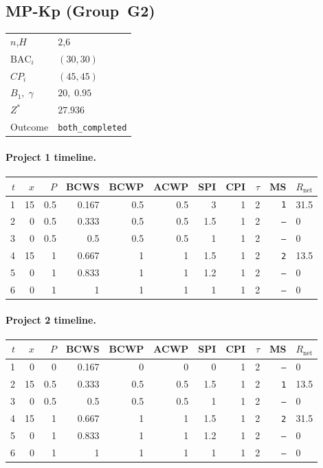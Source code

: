 \documentclass[12pt, a4paper]{article}
\newcommand{\BAC}{\mathrm{BAC}}
\begin{document}
\newpage

\subsection*{MP-Kp  (Group~G2)}
\begin{center}
\begin{tabular}{ll}
\toprule
$n$,\;$H$ & $2$,\;$6$ \\
$\BAC_i$ & $(30, 30)$ \\
$CP_i$   & $(45, 45)$ \\
$B_1,\;\gamma$ & $20,\;0.95$ \\
$Z^*$ & $27.936$ \\
Outcome & \texttt{both_completed} \\
\bottomrule
\end{tabular}
\end{center}

\paragraph{Project 1 timeline.}
\begin{center}
\begin{tabular}{rrrrrrrrrrl}
\toprule
$t$ & $x$ & $P$ & BCWS & BCWP & ACWP & SPI & CPI & $\tau$ & MS & $R_{\mathrm{net}}$\\
\midrule
1 & 15 & 0.5 & 0.167 & 0.5 & 0.5 & 3 & 1 & 2 & \texttt{1} & 31.5 \\
2 & 0 & 0.5 & 0.333 & 0.5 & 0.5 & 1.5 & 1 & 2 & \texttt{---} & 0 \\
3 & 0 & 0.5 & 0.5 & 0.5 & 0.5 & 1 & 1 & 2 & \texttt{---} & 0 \\
4 & 15 & 1 & 0.667 & 1 & 1 & 1.5 & 1 & 2 & \texttt{2} & 13.5 \\
5 & 0 & 1 & 0.833 & 1 & 1 & 1.2 & 1 & 2 & \texttt{---} & 0 \\
6 & 0 & 1 & 1 & 1 & 1 & 1 & 1 & 2 & \texttt{---} & 0 \\
\bottomrule
\end{tabular}
\end{center}
\paragraph{Project 2 timeline.}
\begin{center}
\begin{tabular}{rrrrrrrrrrl}
\toprule
$t$ & $x$ & $P$ & BCWS & BCWP & ACWP & SPI & CPI & $\tau$ & MS & $R_{\mathrm{net}}$\\
\midrule
1 & 0 & 0 & 0.167 & 0 & 0 & 0 & 1 & 2 & \texttt{---} & 0 \\
2 & 15 & 0.5 & 0.333 & 0.5 & 0.5 & 1.5 & 1 & 2 & \texttt{1} & 13.5 \\
3 & 0 & 0.5 & 0.5 & 0.5 & 0.5 & 1 & 1 & 2 & \texttt{---} & 0 \\
4 & 15 & 1 & 0.667 & 1 & 1 & 1.5 & 1 & 2 & \texttt{2} & 31.5 \\
5 & 0 & 1 & 0.833 & 1 & 1 & 1.2 & 1 & 2 & \texttt{---} & 0 \\
6 & 0 & 1 & 1 & 1 & 1 & 1 & 1 & 2 & \texttt{---} & 0 \\
\bottomrule
\end{tabular}
\end{center}
\end{document}
